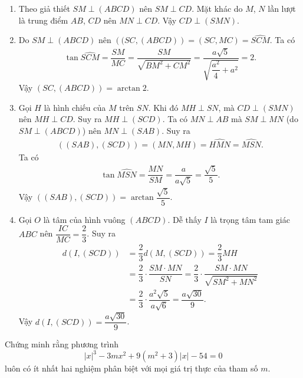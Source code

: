 \begin{bt}
{\begin{center}
\end{center}
\begin{enumerate}
\item Theo giả thiết $SM\perp (ABCD)$ nên $SM\perp CD$. Mặt khác do $M$, $N$ lần lượt là trung điểm $AB$, $CD$ nên $MN\perp CD$. Vậy $CD\perp (SMN)$.
\item Do $SM\perp (ABCD)$ nên $\left( (SC, (ABCD) \right)=(SC,MC)=\widehat{SCM}$. Ta có
\begin{align*}
\tan \widehat{SCM}=\dfrac{SM}{MC}=\dfrac{SM}{\sqrt{BM^2+CM^2}}=\dfrac{a\sqrt{5}}{\sqrt{\dfrac{a^2}{4}+a^2}}=2.
\end{align*}
Vậy $\left( SC,(ABCD) \right)=\arctan 2$.
\item Gọi $H$ là hình chiếu của $M$ trên $SN$. Khi đó $MH\perp SN$, mà $CD\perp (SMN)$ nên $MH\perp CD$. Suy ra $MH\perp (SCD)$. 
Ta có $MN\perp AB$ mà $SM\perp MN$ (do $SM\perp (ABCD)$) nên $MN\perp (SAB)$. Suy ra
\begin{align*}
\left( (SAB), (SCD) \right)= (MN,MH)=\widehat{HMN}=\widehat{MSN}.
\end{align*}
Ta có 
\begin{align*}
\tan \widehat{MSN}=\dfrac{MN}{SM}=\dfrac{a}{a\sqrt{5}}=\dfrac{\sqrt{5}}{5}.
\end{align*}
Vậy $\left( (SAB), (SCD) \right)=\arctan \dfrac{\sqrt{5}}{5}$.
\item Gọi $O$ là tâm của hình vuông $(ABCD)$. Dễ thấy $I$ là trọng tâm tam giác $ABC$ nên $\dfrac{IC}{MC}=\dfrac{2}{3}$. Suy ra
\begin{align*}
d(I,(SCD))&=\dfrac{2}{3}d(M,(SCD))=\dfrac{2}{3}MH\\
&=\dfrac{2}{3}\cdot \dfrac{SM\cdot MN}{SN}=\dfrac{2}{3}\cdot\dfrac{SM\cdot MN}{\sqrt{SM^2+MN^2}}\\
&=\dfrac{2}{3}\cdot \dfrac{a^2\sqrt{5}}{a\sqrt{6}}=\dfrac{a\sqrt{30}}{9}.
\end{align*}
Vậy $d(I,(SCD))=\dfrac{a\sqrt{30}}{9}$.
\end{enumerate}
}
\end{bt}

\begin{bt}%
Chứng minh rằng phương trình 
$$|x|^3-3mx^2+  9(m^2+3)|x|-54=0$$
luôn có ít nhất hai nghiệm phân biệt với mọi giá trị thực của tham số $m$.
\end{bt}
